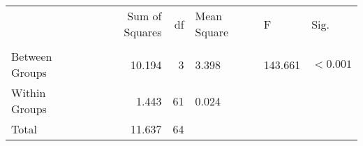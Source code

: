 \begin{tabular}{lrrlll}
\toprule
 & Sum of Squares & df & Mean Square & F & Sig. \\
 &  &  &  &  &  \\
\midrule
Between Groups & 10.194 & 3 & 3.398 & 143.661 & $< 0.001$ \\
Within Groups & 1.443 & 61 & 0.024 &  &  \\
Total & 11.637 & 64 &  &  &  \\
\bottomrule
\end{tabular}
